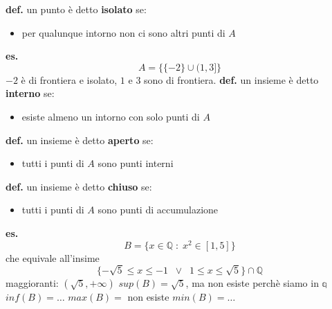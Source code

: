 \textbf{def.} un punto è detto \textbf{isolato} se:
\begin{itemize}
    \item per qualunque intorno non ci sono altri punti di $A$
\end{itemize}
\textbf{es.}
\[
    A = \{\{-2\}\cup(1,3]\}
\]
$-2$ è di frontiera e isolato, $1$ e $3$ sono di frontiera.
\newline
\newline
\textbf{def.} un insieme è detto \textbf{interno} se:
\begin{itemize}
    \item esiste almeno un intorno con solo punti di $A$
\end{itemize}
\textbf{def.} un insieme è detto \textbf{aperto} se:
\begin{itemize}
    \item tutti i punti di $A$ sono punti interni
\end{itemize}
\textbf{def.} un insieme è detto \textbf{chiuso} se:
\begin{itemize}
    \item tutti i punti di $A$ sono punti di accumulazione
\end{itemize}
\textbf{es.}
\[
    B = \{x \in \mathbb{Q} \;:\; x^2 \in [1,5]\}
\]
che equivale all'insime
\[
    \{- \sqrt{5} \leq x \leq -1 \;\; \lor \;\; 1\leq x\leq\sqrt{5} \} \cap \mathbb{Q}
\]
maggioranti: $(\sqrt{5}, +\infty)$
\newline
$sup(B) = \sqrt{5}$, ma non esiste perchè siamo in $\mathbb{q}$
\newline
$inf(B) = \dots$
\newline
$max(B) =$ non esiste
\newline
$min(B) = \dots$
\newpage